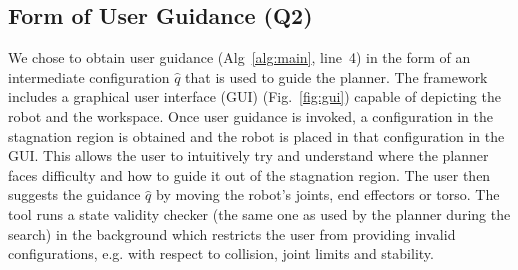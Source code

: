 \documentclass{article}
\begin{document}


%
%


\subsection{Form of User Guidance (Q2)}
\label{sec:q2}
We chose to obtain user guidance 
(Alg~\ref{alg:main}, line~4)
in the form of an intermediate configuration $\hat{q}$ that is used to guide the planner. 
%
The framework includes a graphical user interface (GUI) (Fig.~\ref{fig:gui}) capable of  depicting the robot and the workspace.
Once user guidance is invoked, 
a configuration in the stagnation region is obtained and the robot is placed in that configuration in the GUI.
This allows the user to intuitively try and understand where the planner faces difficulty and how to guide it out of the stagnation region.
The user then suggests the guidance $\hat{q}$ by moving the robot's joints, end effectors or torso.
The tool runs a state validity checker (the same one as used by the planner during the search) in the background which restricts the user from providing invalid configurations, e.g. with respect to collision, joint limits and stability.
\end{document}
